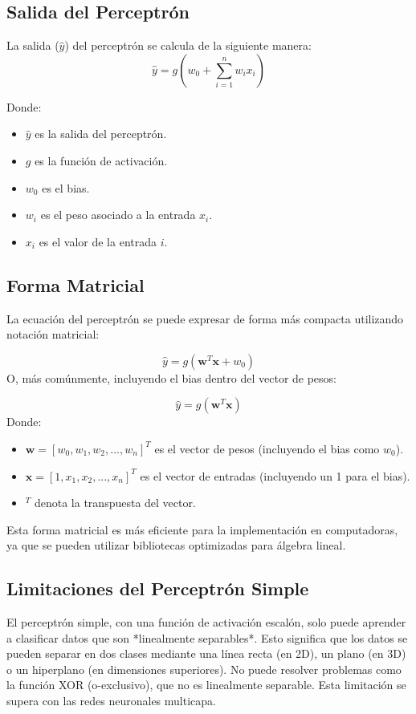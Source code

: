 \documentclass{article}
\begin{document}
\subsection{Salida del Perceptrón}
La salida (\(\hat{y}\)) del perceptrón se calcula de la siguiente manera:
\[
\hat{y} = g\left(w_0 + \sum_{i=1}^{n} w_i x_i\right)
\]

Donde:

\begin{itemize}
    \item \(\hat{y}\) es la salida del perceptrón.
    \item \(g\) es la función de activación.
    \item \(w_0\) es el bias.
    \item \(w_i\) es el peso asociado a la entrada \(x_i\).
    \item \(x_i\) es el valor de la entrada \(i\).
\end{itemize}

\subsection{Forma Matricial}

La ecuación del perceptrón se puede expresar de forma más compacta utilizando notación matricial:

\[
\hat{y} = g(\mathbf{w}^T \mathbf{x} + w_0)
\]
O, más comúnmente, incluyendo el bias dentro del vector de pesos:

\[
\hat{y} = g(\mathbf{w}^T \mathbf{x})
\]
Donde:
\begin{itemize}
\item  \(\mathbf{w} = [w_0, w_1, w_2, ..., w_n]^T\) es el vector de pesos (incluyendo el bias como \(w_0\)).
\item \(\mathbf{x} = [1, x_1, x_2, ..., x_n]^T\) es el vector de entradas (incluyendo un 1 para el bias).
\item \(^T\) denota la transpuesta del vector.
\end{itemize}

Esta forma matricial es más eficiente para la implementación en computadoras, ya que se pueden utilizar bibliotecas optimizadas para álgebra lineal.

\subsection{Limitaciones del Perceptrón Simple}
El perceptrón simple, con una función de activación escalón, solo puede aprender a clasificar datos que son *linealmente separables*.  Esto significa que los datos se pueden separar en dos clases mediante una línea recta (en 2D), un plano (en 3D) o un hiperplano (en dimensiones superiores). No puede resolver problemas como la función XOR (o-exclusivo), que no es linealmente separable. Esta limitación se supera con las redes neuronales multicapa.
\end{document}
